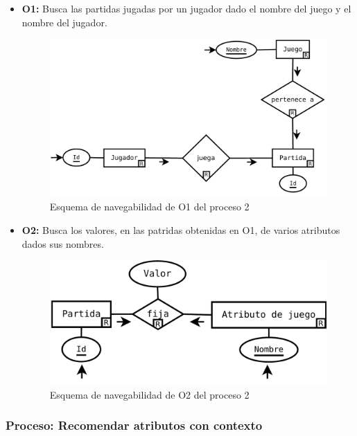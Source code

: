 \begin{itemize}
	\item \textbf{O1:} Busca las partidas jugadas por un jugador dado el nombre del juego y
		el nombre del jugador.\\

	\begin{figure}[H]
		\centering
		\includegraphics[width=0.5\linewidth]{../Diagramas/pdf/Op2-1.pdf}
		\caption{Esquema de navegabilidad de O1 del proceso 2}
	\end{figure}


	\item \textbf{O2:} Busca los valores, en las patridas obtenidas
		en O1, de varios atributos dados sus nombres.\\

	\begin{figure}[H]
		\centering
		\includegraphics[width=0.5\linewidth]{../Diagramas/pdf/Op2-2.pdf}
		\caption{Esquema de navegabilidad de O2 del proceso 2}
	\end{figure}
\end{itemize}



\subsubsection{Proceso: Recomendar atributos con contexto}

